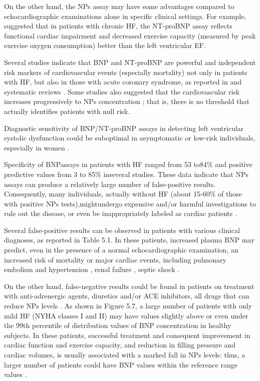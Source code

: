 \documentclass[14pt,a4paper,onecolumn]{extarticle}
\begin{document}
On the other hand, the NPs assay may have some advantages compared to echocardiographic examinations alone in specific clinical settings. For example, \citep{bib375} suggested that in patients with chronic HF, the NT-proBNP assay reflects functional cardiac impairment and decreased exercise capacity (measured by peak exercise oxygen consumption) better than the left ventricular EF.



Several studies indicate that BNP and NT-proBNP are powerful and independent risk markers of cardiovascular events (especially mortality) not only in patients with HF, but also in those with acute coronary syndrome, as reported in  and systematic reviews \citep{bib35} \citep{bib376} \citep{bib377} \citep{bib378}. Some studies also suggested that the cardiovascular risk increases progressively to NPs concentration \citep{bib377} \citep{bib378} \citep{bib3194}; that is, there is no threshold that actually identifies patients with null risk.



Diagnostic sensitivity of BNP/NT-proBNP assays in detecting left ventricular systolic dysfunction could be suboptimal in asymptomatic or low-risk individuals, especially in women \citep{bib39}.



Specificity of BNPassays in patients with HF ranged from 53 to84\% and positive predictive values from 3 to 85\% inseveral studies. These data indicate that NPs assays can produce a relatively large number of false-positive results. Consequently, many individuals, actually without HF (about 15-60\% of those with positive NPs tests),mightundergo expensive and/or harmful investigations to rule out the disease, or even be inappropriately labeled as cardiac patients \citep{bib35}.



Several false-positive results can be observed in patients with various clinical diagnoses, as reported in Table 5.1. In these patients, increased plasma BNP may predict, even in the presence of a normal echocardiographic examination, an increased risk of mortality or major cardiac events, including pulmonary embolism \citep{121} \citep{123} \citep{bib382} and hypertension \citep{bib383}, renal failure \citep{bib384} \citep{bib385}, septic shock \citep{bib386}.



On the other hand, false-negative results could be found in patients on treatment with anti-adrenergic agents, diuretics and/or ACE inhibitors, all drugs that can reduce NPs levels \citep{bib35}. As shown in Figure 5.7, a large number of patients with only mild HF (NYHA classes I and II) may have values slightly above or even under the 99th percentile of distribution values of BNP concentration in healthy subjects. In these patients, successful treatment and consequent improvement in cardiac function and exercise capacity, and reduction in filling pressure and cardiac volumes, is usually associated with a marked fall in NPs levels: thus, a larger number of patients could have BNP values within the reference range values \citep{bib35} \citep{bib390}. %
\end{document}
